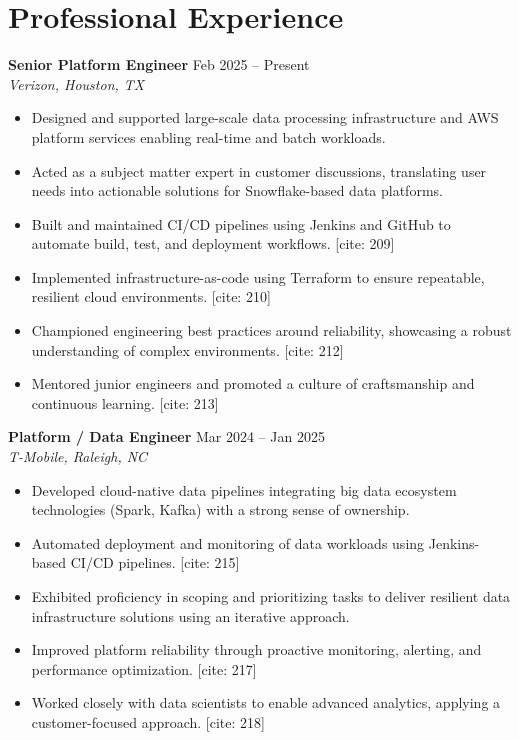 \documentclass[10pt]{article}
\begin{document}
\section*{Professional Experience}

\textbf{Senior Platform Engineer} \hfill Feb 2025 -- Present \\
\textit{Verizon, Houston, TX}
\begin{itemize}[leftmargin=*, itemsep=3pt]
    \item Designed and supported large-scale data processing infrastructure and AWS platform services enabling real-time and batch workloads. 
    \item Acted as a subject matter expert in customer discussions, translating user needs into actionable solutions for Snowflake-based data platforms. 
    \item Built and maintained CI/CD pipelines using Jenkins and GitHub to automate build, test, and deployment workflows. [cite: 209]
    \item Implemented infrastructure-as-code using Terraform to ensure repeatable, resilient cloud environments. [cite: 210]
    \item Championed engineering best practices around reliability, showcasing a robust understanding of complex environments. [cite: 212]
    \item Mentored junior engineers and promoted a culture of craftsmanship and continuous learning. [cite: 213]
\end{itemize}

\textbf{Platform / Data Engineer} \hfill Mar 2024 -- Jan 2025 \\
\textit{T-Mobile, Raleigh, NC}
\begin{itemize}[leftmargin=*, itemsep=3pt]
    \item Developed cloud-native data pipelines integrating big data ecosystem technologies (Spark, Kafka) with a strong sense of ownership. 
    \item Automated deployment and monitoring of data workloads using Jenkins-based CI/CD pipelines. [cite: 215]
    \item Exhibited proficiency in scoping and prioritizing tasks to deliver resilient data infrastructure solutions using an iterative approach. 
    \item Improved platform reliability through proactive monitoring, alerting, and performance optimization. [cite: 217]
    \item Worked closely with data scientists to enable advanced analytics, applying a customer-focused approach. [cite: 218]
\end{itemize}
\end{document}
